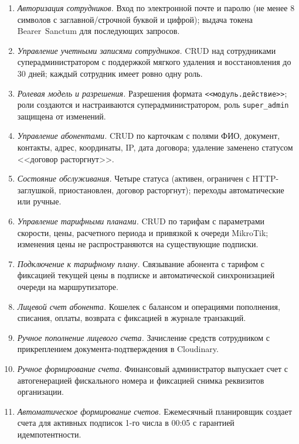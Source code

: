 \begin{enumerate}
\item \emph{Авторизация сотрудников.} Вход по электронной почте и паролю (не менее 8 символов с заглавной/строчной буквой и цифрой); выдача токена Bearer~Sanctum для последующих запросов.

\item \emph{Управление учетными записями сотрудников.} CRUD над сотрудниками суперадминистратором с поддержкой мягкого удаления и восстановления до 30 дней; каждый сотрудник имеет ровно одну роль.

\item \emph{Ролевая модель и разрешения.} Разрешения формата \texttt{<<модуль.действие>>}; роли создаются и настраиваются суперадминистратором, роль \texttt{super\_admin} защищена от изменений.

\item \emph{Управление абонентами.} CRUD по карточкам с полями ФИО, документ, контакты, адрес, координаты, IP, дата договора; удаление заменено статусом <<договор расторгнут>>.

\item \emph{Состояние обслуживания.} Четыре статуса (активен, ограничен с HTTP-заглушкой, приостановлен, договор расторгнут); переходы автоматические или ручные.

\item \emph{Управление тарифными планами.} CRUD по тарифам с параметрами скорости, цены, расчетного периода и привязкой к очереди MikroTik; изменения цены не распространяются на существующие подписки.

\item \emph{Подключение к тарифному плану.} Связывание абонента с тарифом с фиксацией текущей цены в подписке и автоматической синхронизацией очереди на маршрутизаторе.

\item \emph{Лицевой счет абонента.} Кошелек с балансом и операциями пополнения, списания, оплаты, возврата с фиксацией в журнале транзакций.

\item \emph{Ручное пополнение лицевого счета.} Зачисление средств сотрудником с прикреплением документа-подтверждения в Cloudinary.

\item \emph{Ручное формирование счета.} Финансовый администратор выпускает счет с автогенерацией фискального номера и фиксацией снимка реквизитов организации.

\item \emph{Автоматическое формирование счетов.} Ежемесячный планировщик создает счета для активных подписок 1-го числа в 00:05 с гарантией идемпотентности.


\end{enumerate}
